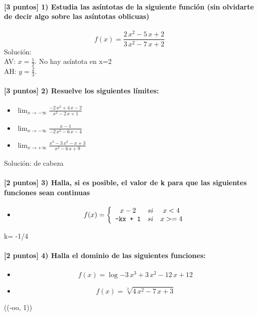 \paragraph{[3 puntos] 1) Estudia las asíntotas de la siguiente función (sin olvidarte de decir algo sobre las asíntotas oblicuas)} \[f(x) = \frac{ 2 \, x^{2} - 5 \, x + 2 }{ 3 \, x^{2} - 7 \, x + 2 }\] Solución:\\ AV: $x= \frac{1}{2}$. No hay asíntota en x=2 \\ AH: $y= \frac{2}{3} $. \paragraph{[3 puntos] 2) Resuelve los siguientes límites:}\begin{itemize}\item $\displaystyle\lim_{x\to-\infty} \frac{ -2 \, x^{2} + 4 \, x - 2 }{ x^{2} - 2 \, x + 1 }$ \item $\displaystyle\lim_{x\to-\infty} \frac{ x - 1 }{ -2 \, x^{2} - 6 \, x - 4 }$ \item $\displaystyle\lim_{x\to+\infty} \frac{ x^{3} - 3 \, x^{2} - x + 3 }{ x^{2} - 6 \, x + 9 }$\end{itemize}Solución: de cabeza \paragraph{[2 puntos] 3) Halla, si es posible, el valor de k para que las siguientes funciones sean continuas}\begin{itemize} \item\[ f(x)=\left\{\begin{array}{ccc} x - 2 & si & x<4 \\ \text{\texttt{{-}kx{ }+{ }1}} & si & x>=4 \\ \end{array}\right. \] \end{itemize}  k= -1/4 \paragraph{[2 puntos] 4) Halla el dominio de las siguientes funciones:}\begin{itemize} \item \[f(x) = \log{ -3 \, x^{3} + 3 \, x^{2} - 12 \, x + 12 }\] \item \[f(x) = \sqrt[3]{ 4 \, x^{2} - 7 \, x + 3 }\] \end{itemize} ((-oo, 1))